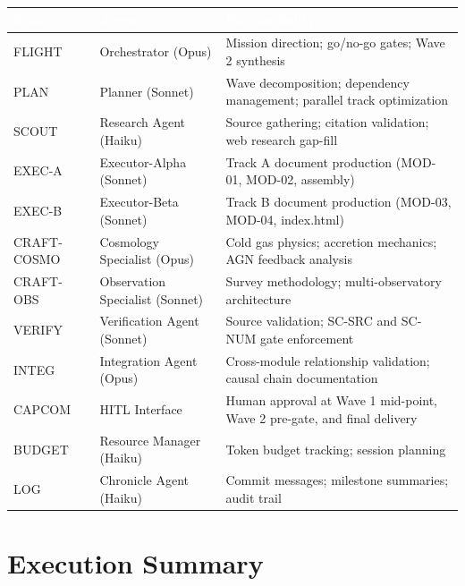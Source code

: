 \documentclass[11pt,letterpaper]{article}
\newcommand{\tableheader}[1]{\textbf{\sffamily\textcolor{white}{#1}}}
\begin{document}
\begin{center}
\begin{tabularx}{\textwidth}{L{2cm}L{3.5cm}X}
\toprule
{}
\tableheader{Role} & \tableheader{Agent} & \tableheader{Responsibility} \\
\midrule
FLIGHT & Orchestrator (Opus) & Mission direction; go/no-go gates; Wave 2 synthesis \\
PLAN & Planner (Sonnet) & Wave decomposition; dependency management; parallel track optimization \\
SCOUT & Research Agent (Haiku) & Source gathering; citation validation; web research gap-fill \\
EXEC-A & Executor-Alpha (Sonnet) & Track A document production (MOD-01, MOD-02, assembly) \\
EXEC-B & Executor-Beta (Sonnet) & Track B document production (MOD-03, MOD-04, index.html) \\
CRAFT-COSMO & Cosmology Specialist (Opus) & Cold gas physics; accretion mechanics; AGN feedback analysis \\
CRAFT-OBS & Observation Specialist (Sonnet) & Survey methodology; multi-observatory architecture \\
VERIFY & Verification Agent (Sonnet) & Source validation; SC-SRC and SC-NUM gate enforcement \\
INTEG & Integration Agent (Opus) & Cross-module relationship validation; causal chain documentation \\
CAPCOM & HITL Interface & Human approval at Wave 1 mid-point, Wave 2 pre-gate, and final delivery \\
BUDGET & Resource Manager (Haiku) & Token budget tracking; session planning \\
LOG & Chronicle Agent (Haiku) & Commit messages; milestone summaries; audit trail \\
\bottomrule
\end{tabularx}
\end{center}

\section{Execution Summary}
\end{document}
